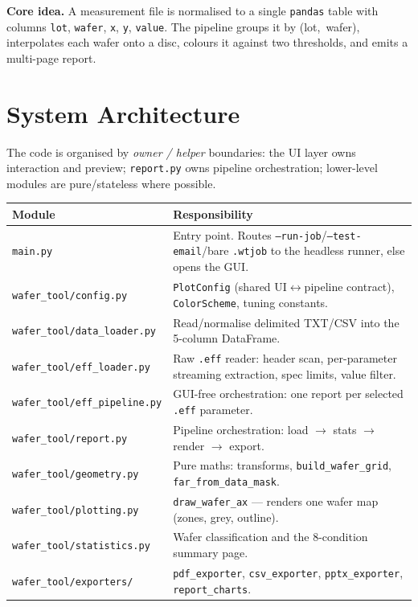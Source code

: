 \documentclass[11pt,a4paper]{article}
\newcommand{\code}[1]{\texttt{#1}}
\begin{document}
\noindent\textbf{Core idea.} A measurement file is normalised to a single
\texttt{pandas} table with columns \code{lot}, \code{wafer}, \code{x}, \code{y},
\code{value}. The pipeline groups it by (lot,~wafer), interpolates each wafer
onto a disc, colours it against two thresholds, and emits a multi-page report.

\section{System Architecture}
The code is organised by \emph{owner / helper} boundaries: the UI layer owns
interaction and preview; \code{report.py} owns pipeline orchestration;
lower-level modules are pure/stateless where possible.

\begin{center}\small
\begin{longtable}{@{}p{4.6cm}p{10.2cm}@{}}
\toprule
\textbf{Module} & \textbf{Responsibility}\\
\midrule
\endhead
\texttt{main.py} & Entry point. Routes \code{--run-job}/\code{--test-email}/bare \texttt{.wtjob} to the headless runner, else opens the GUI. \\
\texttt{wafer\_tool/config.py} & \code{PlotConfig} (shared UI$\leftrightarrow$pipeline contract), \code{ColorScheme}, tuning constants. \\
\texttt{wafer\_tool/data\_loader.py} & Read/normalise delimited TXT/CSV into the 5-column DataFrame. \\
\texttt{wafer\_tool/eff\_loader.py} & Raw \texttt{.eff} reader: header scan, per-parameter streaming extraction, spec limits, value filter. \\
\texttt{wafer\_tool/eff\_pipeline.py} & GUI-free orchestration: one report per selected \texttt{.eff} parameter. \\
\texttt{wafer\_tool/report.py} & Pipeline orchestration: load $\to$ stats $\to$ render $\to$ export. \\
\texttt{wafer\_tool/geometry.py} & Pure maths: transforms, \code{build_wafer_grid}, \code{far_from_data_mask}. \\
\texttt{wafer\_tool/plotting.py} & \code{draw_wafer_ax} --- renders one wafer map (zones, grey, outline). \\
\texttt{wafer\_tool/statistics.py} & Wafer classification and the 8-condition summary page. \\
\texttt{wafer\_tool/exporters/} & \code{pdf_exporter}, \code{csv_exporter}, \code{pptx_exporter}, \code{report_charts}. \\

\end{longtable}
\end{center}
\end{document}
